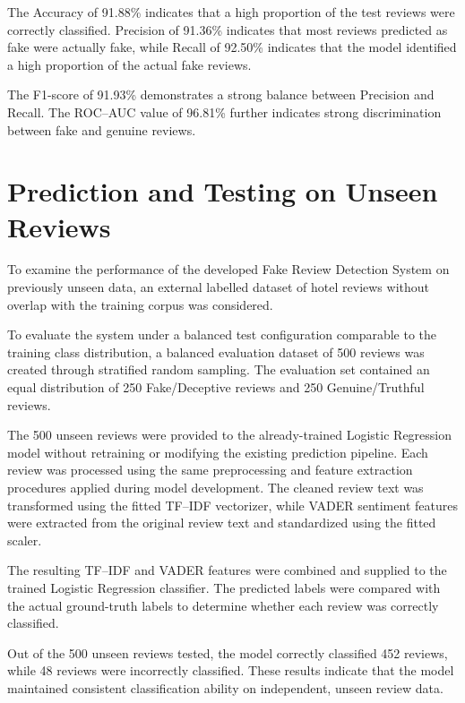\documentclass[12pt,a4paper]{report}
\begin{document}
The Accuracy of 91.88\% indicates that a high proportion of the test
reviews were correctly classified. Precision of 91.36\% indicates
that most reviews predicted as fake were actually fake, while Recall
of 92.50\% indicates that the model identified a high proportion of
the actual fake reviews.

The F1-score of 91.93\% demonstrates a strong balance between
Precision and Recall. The ROC--AUC value of 96.81\% further indicates
strong discrimination between fake and genuine reviews.


\section{Prediction and Testing on Unseen Reviews}

To examine the performance of the developed Fake Review
Detection System on previously unseen data, an external
labelled dataset of hotel reviews without overlap with
the training corpus was considered.

To evaluate the system under a balanced test configuration
comparable to the training class distribution, a balanced
evaluation dataset of 500 reviews was created through
stratified random sampling. The evaluation set contained
an equal distribution of 250 Fake/Deceptive reviews
and 250 Genuine/Truthful reviews.

The 500 unseen reviews were provided to the already-trained
Logistic Regression model without retraining or modifying
the existing prediction pipeline. Each review was processed
using the same preprocessing and feature extraction procedures
applied during model development. The cleaned review text
was transformed using the fitted TF--IDF vectorizer, while
VADER sentiment features were extracted from the original
review text and standardized using the fitted scaler.

The resulting TF--IDF and VADER features were combined
and supplied to the trained Logistic Regression
classifier. The predicted labels were compared with
the actual ground-truth labels to determine whether each
review was correctly classified.

Out of the 500 unseen reviews tested, the model correctly
classified 452 reviews, while 48 reviews were
incorrectly classified. These results indicate that
the model maintained consistent classification ability
on independent, unseen review data.
\end{document}
